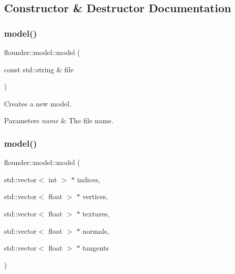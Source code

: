 \subsection{Constructor \& Destructor Documentation}
\mbox{\label{classflounder_1_1model_aa91d042d6c08955bb113803933bbfdd6}} 
\subsubsection{\texorpdfstring{model()}{model()}\hspace{0.1cm}{\footnotesize\ttfamily [1/2]}}
{\footnotesize\ttfamily flounder\+::model\+::model (\begin{DoxyParamCaption}\item[{const std\+::string \&}]{file }\end{DoxyParamCaption})}



Creates a new model. 


\begin{DoxyParams}{Parameters}
{\em name} & The file name. \\
\hline
\end{DoxyParams}
\mbox{\label{classflounder_1_1model_ac66ffb48f0139fbcda4d216ba8c5a7f3}} 
\subsubsection{\texorpdfstring{model()}{model()}\hspace{0.1cm}{\footnotesize\ttfamily [2/2]}}
{\footnotesize\ttfamily flounder\+::model\+::model (\begin{DoxyParamCaption}\item[{std\+::vector$<$ int $>$ $\ast$}]{indices,  }\item[{std\+::vector$<$ float $>$ $\ast$}]{vertices,  }\item[{std\+::vector$<$ float $>$ $\ast$}]{textures,  }\item[{std\+::vector$<$ float $>$ $\ast$}]{normals,  }\item[{std\+::vector$<$ float $>$ $\ast$}]{tangents }\end{DoxyParamCaption})}



